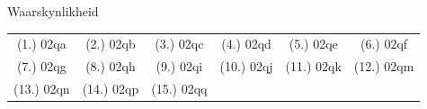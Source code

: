\begin{eocexercises}{Waarskynlikheid}
\par \practiceinfo
\par \begin{tabular}[h]{cccccc}
(1.)	02qa	&
(2.)	02qb	&
(3.)	02qc	&
(4.)	02qd	&
(5.)	02qe	&
(6.)	02qf	\\ %
(7.)	02qg	&
(8.)	02qh	&
(9.)	02qi	&
(10.)	02qj	&
(11.)	02qk	&
(12.)	02qm	\\ %
(13.)	02qn	&
(14.)	02qp	&
(15.)	02qq	&
\end{tabular}
\end{eocexercises}
